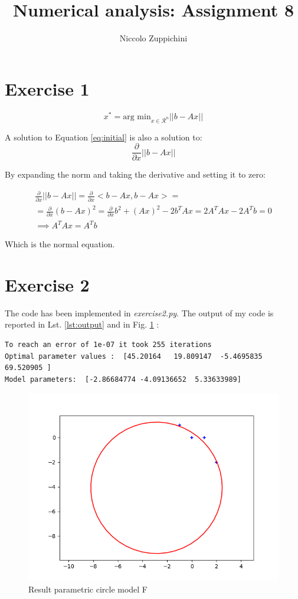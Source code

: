 \documentclass[12pt]{article}
\title{Numerical analysis: Assignment 8}
\author{Niccolo Zuppichini}
\begin{document}
\maketitle
\section*{Exercise 1}


\begin{equation}
	x^* = \textrm{arg min}_{x \in \mathcal{R}^n} ||b - Ax||
	\label{eq:initial}
\end{equation}


A solution to Equation \ref{eq:initial} is also a solution to: \\

\begin{equation}
	\frac{\partial}{\partial x} ||b - Ax||
\end{equation}

By expanding the norm and taking the derivative and setting it to zero:

\begin{equation}
	\begin{split}
		\frac{\partial}{\partial x} ||b - Ax|| = \frac{\partial}{\partial x}  <b - Ax, b - Ax> = \\
		= \frac{\partial}{\partial x} (b - Ax)^2 = \frac{\partial}{\partial x} b^2 + (Ax)^2 - 2 b^T Ax = 2 A^T A x - 2 A^T b = 0  \\
		\implies  A^T A x = A^T b
	\end{split} 	
\end{equation}

Which is the normal equation. \\

\section*{Exercise 2}

The code has been implemented in \textit{exercise2.py}. The output of my code is reported in Lst. \ref{lst:output} and in Fig. \ref{fig:output} : \\

\begin{lstlisting}[caption=Code output, label=lst:output]
To reach an error of 1e-07 it took 255 iterations
Optimal parameter values :  [45.20164   19.809147  -5.4695835 69.520905 ]
Model parameters:  [-2.86684774 -4.09136652  5.33633989]
\end{lstlisting}

\begin{figure}[h]
\centering
\includegraphics[width = 0.7 \linewidth]{ex2plot.png}
\caption{Result parametric circle model F}
\label{fig:output}
\end{figure}
\end{document}
